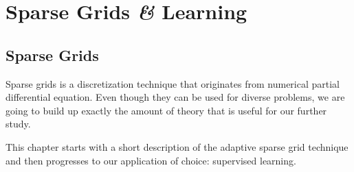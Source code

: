 \chapter{Sparse Grids \textit{\&} Learning}

\section{Sparse Grids}
Sparse grids is a discretization technique that originates from numerical
partial differential equation.
Even though they can be used for diverse problems, we are going to build up
exactly the amount of theory that is useful for our further study.

This chapter starts with a short description of the adaptive sparse grid
technique and then progresses to our application of choice: supervised learning.

